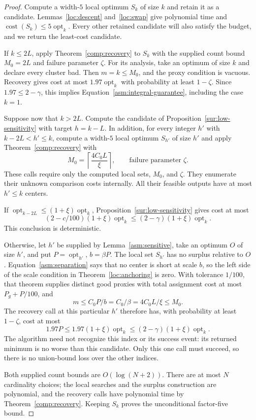 \begin{proof}
Compute a width-$5$ local optimum $S_k$ of size $k$ and retain it
as a candidate. Lemmas~\ref{loc:descent} and~\ref{loc:swap} give
polynomial time and $\operatorname{cost}(S_k)\le5\operatorname{opt}_k$.
Every other retained candidate will also satisfy the budget, and we
return the least-cost candidate.

If $k\le2L$, apply Theorem~\ref{comp:recovery} to $S_k$ with
the supplied count bound $M_0=2L$ and failure parameter $\zeta$.
For its analysis, take an optimum of size $k$ and declare every
cluster bad. Then $m=k\le M_0$, and the proxy condition is vacuous.
Recovery gives cost at most $1.97\operatorname{opt}_k$ with
probability at least $1-\zeta$. Since
$1.97\le2-\gamma$, this implies
Equation~\eqref{asm:integral-guarantee}, including the case $k=1$.

Suppose now that $k>2L$. Compute the candidate of
Proposition~\ref{sur:low-sensitivity} with target $h=k-L$.
In addition, for every integer $h'$ with $k-2L<h'\le k$, compute
a width-$5$ local optimum $S_{h'}$ of size $h'$ and apply
Theorem~\ref{comp:recovery} with
\begin{equation}\label{asm:count-bound}
 M_0=\left\lceil\frac{4C_0L}{\xi}\right\rceil,
 \qquad\text{failure parameter }\zeta.
\end{equation}
These calls require only the computed local sets, $M_0$, and $\zeta$.
They enumerate their unknown comparison costs internally.
All their feasible outputs have at most $h'\le k$ centers.

If $\operatorname{opt}_{k-2L}\le(1+\xi)\operatorname{opt}_k$,
Proposition~\ref{sur:low-sensitivity} gives cost at most
\[
 (2-c/100)(1+\xi)\operatorname{opt}_k
 \le(2-\gamma)(1+\xi)\operatorname{opt}_k.
\]
This conclusion is deterministic.

Otherwise, let $h'$ be supplied by Lemma~\ref{asm:sensitive},
take an optimum $O$ of size $h'$, and put
$P=\operatorname{opt}_{h'}$, $b=\beta P$.
The local set $S_{h'}$ has no surplus relative to $O$.
Equation~\eqref{asm:separation} says that no center is short
at scale $b$, so the left side of the scale condition in
Theorem~\ref{loc:anchoring} is zero. With tolerance $1/100$,
that theorem supplies distinct good proxies with total assignment
cost at most $P_g+P/100$, and
\[
 m\le C_0P/b=C_0/\beta=4C_0L/\xi\le M_0.
\]
The recovery call at this particular $h'$ therefore has, with
probability at least $1-\zeta$, cost at most
\[
 1.97P\le1.97(1+\xi)\operatorname{opt}_k
 \le(2-\gamma)(1+\xi)\operatorname{opt}_k.
\]
The algorithm need not recognize this index or its success event:
its returned minimum is no worse than this candidate. Only this
one call must succeed, so there is no union-bound loss over the
other indices.

Both supplied count bounds are $O(\log(N+2))$. There are at most
$N$ cardinality choices; the local searches and the surplus
construction are polynomial, and the recovery calls have polynomial
time by Theorem~\ref{comp:recovery}. Keeping $S_k$ proves the
unconditional factor-five bound.
\end{proof}

